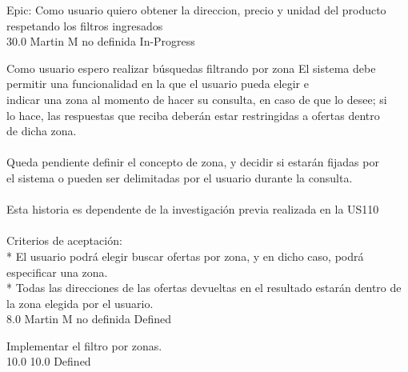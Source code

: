 \vspace{20pt}

	{Epic: Como usuario quiero obtener la direccion, precio y unidad del producto respetando los filtros ingresados} %
	{\\
} %
	{} %
	{30.0} %
	{Martin M} %
	{no definida} %
	{In-Progress} %


\vspace{20pt}

	{Como usuario espero realizar búsquedas filtrando por zona} %
	{El sistema debe permitir una funcionalidad en la que el usuario pueda elegir e\\
indicar una zona al momento de hacer su consulta, en caso de que lo desee; si\\
lo hace, las respuestas que reciba deberán estar restringidas a ofertas dentro\\
de dicha zona.\\
  \\
Queda pendiente definir el concepto de zona, y decidir si estarán fijadas por\\
el sistema o pueden ser delimitadas por el usuario durante la consulta.\\
  \\
Esta historia es dependente de la investigación previa realizada en la US110\\
  \\
Criterios de aceptación:\\
* El usuario podrá elegir buscar ofertas por zona, y en dicho caso, podrá especificar una zona.  \\
* Todas las direcciones de las ofertas devueltas en el resultado estarán dentro de la zona elegida por el usuario.\\
} %
	{} %
	{8.0} %
	{Martin M} %
	{no definida} %
	{Defined} %

		{Implementar el filtro por zonas.} %
		{\\
} %
		{10.0} %
		{} %
		{10.0} %
		{Defined} %


\vspace{20pt}

